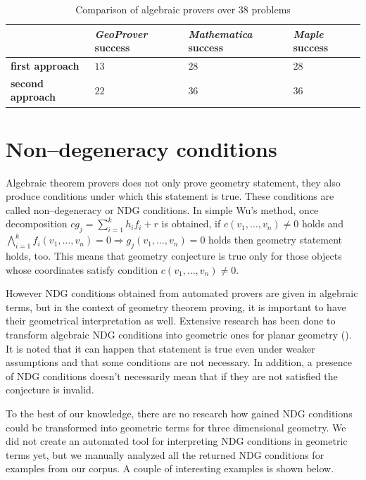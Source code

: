 \documentclass[final,1p,times,authoryear]{elsarticle}
\begin{document}
\begin{table}[!hb]
\begin{center}
\begin{tabular}{L{2cm}||R{2cm}|R{2cm}|R{2cm}}
\                      & \emph{GeoProver}  success & \emph{Mathematica} success & \emph{Maple} success \\
\hline
\hline
\textbf{first approach}  &  $13$  & $28$ & $28$  \\
\hline
\textbf{second approach} &  $22$  & $36$ & $36$ \\
\end{tabular}
\caption{Comparison of algebraic provers over $38$ problems}
\end{center}
\end{table}


\section{Non--degeneracy conditions}


Algebraic theorem provers does not only prove geometry statement, they
also produce conditions under which this statement is true. These
conditions are called non--degeneracy or NDG conditions. In simple
Wu's method, once decomposition $cg_j = \sum_{i=1}^{k}h_if_i + r$ is
obtained, if $c(v_1, \ldots, v_n) \neq 0$ holds and $\bigwedge_{i =
  1}^{k} f_i(v_1, \ldots, v_n) = 0 \Longrightarrow g_j(v_1, \ldots,
v_n) = 0$ holds then geometry statement holds, too. This means that
geometry conjecture is true only for those objects whose coordinates
satisfy condition $c(v_1, \ldots, v_n) \neq 0$.  

However NDG conditions obtained from automated provers are given in
algebraic terms, but in the context of geometry theorem proving, it is
important to have their geometrical interpretation as well. Extensive
research has been done to transform algebraic NDG conditions into
geometric ones for planar geometry (\cite{chou1988mechanical}). It is
noted that it can happen that statement is true even under weaker
assumptions and that some conditions are not necessary. In addition, a
presence of NDG conditions doesn't necessarily mean that if they are
not satisfied the conjecture is invalid.

To the best of our knowledge, there are no research how gained NDG
conditions could be transformed into geometric terms for three
dimensional geometry. We did not create an automated tool for
interpreting NDG conditions in geometric terms yet, but we manually
analyzed all the returned NDG conditions for examples from our
corpus. A couple of interesting examples is shown below.
\end{document}
